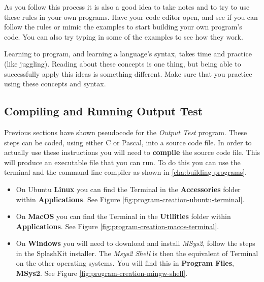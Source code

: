 As you follow this process it is also a good idea to take notes and to try to use these rules in your own programs. Have your code editor open, and see if you can follow the rules or mimic the examples to start building your own program's code. You can also try typing in some of the examples to see how they work.

Learning to program, and learning a language's syntax, takes time and practice (like juggling). Reading about these concepts is one thing, but being able to successfully apply this ideas is something different. Make sure that you practice using these concepts and syntax.



\subsection{Compiling and Running Output Test} %
\label{sub:compiling_and_running_output_test}

Previous sections have shown pseudocode for the \emph{Output Test} program. These steps can be coded, using either C or Pascal, into a source code file. In order to actually use these instructions you will need to \textbf{compile} the source code file. This will produce an executable file that you can run. To do this you can use the terminal and the command line compiler as shown in \cref{cha:building programs}.

\begin{itemize}
  \item On Ubuntu \textbf{Linux} you can find the Terminal in the \textbf{Accessories} folder within \textbf{Applications}. See Figure \ref{fig:program-creation-ubuntu-terminal}.
  \item On \textbf{MacOS} you can find the Terminal in the \textbf{Utilities} folder within \textbf{Applications}. See Figure \ref{fig:program-creation-macos-terminal}.
  \item On \textbf{Windows} you will need to download and install \emph{MSys2}, follow the steps in the SplashKit installer. The \emph{Msys2 Shell} is then the equivalent of Terminal on the other operating systems. You will find this in \textbf{Program Files}, \textbf{MSys2}. See Figure \ref{fig:program-creation-mingw-shell}.
\end{itemize}

